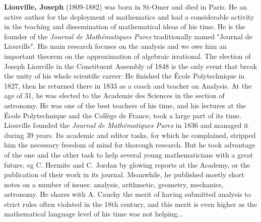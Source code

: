 \textbf{Liouville, Joseph} (1809-1882) was born in St-Omer and died in Paris. He an active author for the deployment of mathematics and had a considerable activity in the teaching and dissemination of mathematical ideas of his time. He is the founder of the\textit{ Journal de Mathématiques Pures} traditionally named "Journal de Liouville". His main research focuses on the analysis and we owe him an important theorem on the approximation of algebraic irrational. The election of Joseph Liouville in the Constituent Assembly of 1848 is the only event that break the unity of his whole scientific career: He finished the École Polytechnique in 1827, then he returned there in 1833 as a coach and teacher on Analysis. At the age of 31, he was elected to the Academie des Sciences in the section of astronomy. He was one of the best teachers of his time, and his lectures at the École Polytechnique and the Collège de France, took a large part of its time. Liouville founded the \textit{Journal de Mathématiques Pures} in 1836 and managed it during 39 years. Its academic and editor tasks, for which he complained, stripped him the necessary freedom of mind for thorough research. But he took advantage of the one and the other task to help several young mathematicians with a great future, eg C. Hermite and C. Jordan by glowing reports at the Academy, or the publication of their work in its journal. Meanwhile, he published mostly short notes on a number of issues: analysis, arithmetic, geometry, mechanics, astronomy. He shares with A. Cauchy the merit of having submitted analysis to strict rules often violated in the 18th century, and this merit is even higher as the mathematical language level of his time was not helping...

